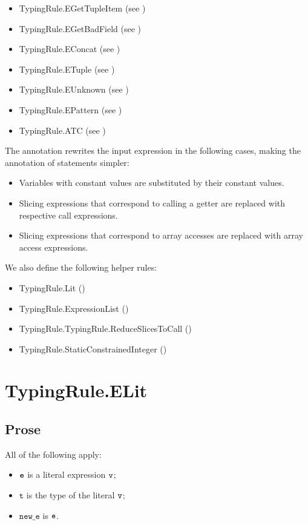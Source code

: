 \documentclass{book}
\newcommand\vt[0]{\texttt{t}}
\newcommand\newe[0]{\texttt{new\_e}}
\begin{document}
\begin{itemize}
\item TypingRule.EGetTupleItem (see )
\item TypingRule.EGetBadField (see )
\item TypingRule.EConcat (see )
\item TypingRule.ETuple (see )
\item TypingRule.EUnknown (see )
\item TypingRule.EPattern (see )
\item TypingRule.ATC (see )
\end{itemize}

The annotation rewrites the input expression in the following cases, making the annotation of statements simpler:
\begin{itemize}
  \item Variables with constant values are substituted by their constant values.
  \item Slicing expressions that correspond to calling a getter are replaced with respective call expressions.
  \item Slicing expressions that correspond to array accesses are replaced with array access expressions.
\end{itemize}

We also define the following helper rules:
\begin{itemize}
  \item TypingRule.Lit ()
  \item TypingRule.ExpressionList ()
  \item TypingRule.TypingRule.ReduceSlicesToCall ()
  \item TypingRule.StaticConstrainedInteger ()
\end{itemize}

\section{TypingRule.ELit \label{sec:TypingRule.ELit}}
\subsection{Prose}
All of the following apply:
\begin{itemize}
\item $\texttt{e}$ is a literal expression $\texttt{v}$;
\item $\vt$ is the type of the literal $\texttt{v}$;
\item $\newe$ is $\texttt{e}$.
\end{itemize}
\end{document}
